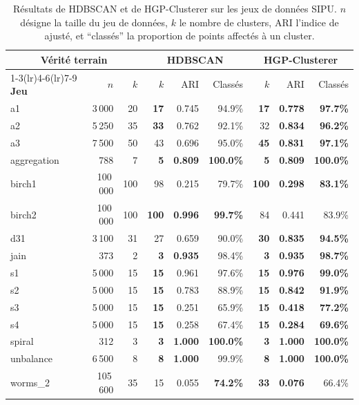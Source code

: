 \begin{table}[htbp]
\centering
\caption{Résultats de HDBSCAN et de HGP-Clusterer sur les jeux de données SIPU. $n$ désigne la taille du jeu de données, $k$ le nombre de clusters, ARI l'indice de  ajusté, et ``classés'' la proportion de points affectés à un cluster.}
\small
\label{tab:chapV_sipu}
\begin{tabular}{@{}lrrrrrrrr@{}}
\toprule
\multicolumn{3}{c}{\textbf{Vérité terrain}} &
\multicolumn{3}{c}{\textbf{HDBSCAN}} &
\multicolumn{3}{c}{\textbf{HGP-Clusterer}} \\
\cmidrule(lr){1-3}\cmidrule(lr){4-6}\cmidrule(lr){7-9}
\textbf{Jeu} & $n$ & $k$ & $k$ & ARI & Classés & $k$ & ARI & Classés \\
\midrule
a1 & 3\,000 & 20 & \textbf{17} & 0.745 & 94.9\% & \textbf{17} & \textbf{0.778} & \textbf{97.7\%}\\
a2 & 5\,250 & 35 & \textbf{33} & 0.762 & 92.1\% & 32 & \textbf{0.834} & \textbf{96.2\%} \\
a3 & 7\,500 & 50 & 43 & 0.696 & 95.0\% & \textbf{45} & \textbf{0.831} & \textbf{97.1\%} \\
aggregation & 788 & 7 & \textbf{5} & \textbf{0.809} & \textbf{100.0\%} & \textbf{5} & \textbf{0.809} & \textbf{100.0\%} \\
birch1 & 100\,000 & 100 & 98 & 0.215 & 79.7\% & \textbf{100} & \textbf{0.298} & \textbf{83.1\%} \\
birch2 & 100\,000 & 100 & \textbf{100} & \textbf{0.996} & \textbf{99.7\%} & 84 & 0.441 & 83.9\% \\
d31 & 3\,100 & 31 & 27 & 0.659 & 90.0\% & \textbf{30} & \textbf{0.835} & \textbf{94.5\%} \\
jain & 373 & 2 & \textbf{3} & \textbf{0.935} & 98.4\% & \textbf{3} & \textbf{0.935} & \textbf{98.7\%} \\
s1 & 5\,000 & 15 & \textbf{15} & 0.961 & 97.6\% & \textbf{15} & \textbf{0.976} & \textbf{99.0\%} \\
s2 & 5\,000 & 15 & \textbf{15} & 0.783 & 88.9\% & \textbf{15} & \textbf{0.842} & \textbf{91.9\%} \\
s3 & 5\,000 & 15 & \textbf{15} & 0.251 & 65.9\% & \textbf{15} & \textbf{0.418} & \textbf{77.2\%} \\
s4 & 5\,000 & 15 & \textbf{15} & 0.258 & 67.4\% & \textbf{15} & \textbf{0.284} & \textbf{69.6\%} \\
spiral & 312 & 3 & \textbf{3} & \textbf{1.000} & \textbf{100.0\%} & \textbf{3} & \textbf{1.000} & \textbf{100.0\%} \\
unbalance & 6\,500 & 8 & \textbf{8} & \textbf{1.000} & 99.9\% & \textbf{8} & \textbf{1.000} & \textbf{100.0\%} \\
worms\_2 & 105\,600 & 35 & 15 & 0.055 & \textbf{74.2\%} & \textbf{33} & \textbf{0.076} & 66.4\% \\
\bottomrule
\end{tabular}%
\end{table}


